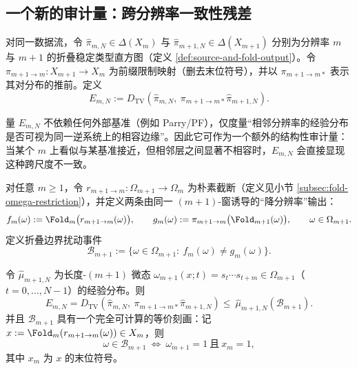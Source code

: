 \subsection{一个新的审计量：跨分辨率一致性残差}\label{subsec:multiscale-residual}

\begin{definition}[跨分辨率一致性残差]\label{def:multiscale-residual}
对同一数据流，令 \(\hat{\pi}_{m,N}\in\Delta(X_m)\) 与 \(\hat{\pi}_{m+1,N}\in\Delta(X_{m+1})\) 分别为分辨率 \(m\) 与 \(m+1\) 的折叠稳定类型直方图（定义 \ref{def:source-and-fold-output}）。令 \(\pi_{m+1\to m}:X_{m+1}\to X_m\) 为前缀限制映射（删去末位符号），并以 \(\pi_{m+1\to m*}\) 表示其对分布的推前。定义
\[
E_{m,N}
:=
D_{\mathrm{TV}}\!\left(\hat{\pi}_{m,N},\ \pi_{m+1\to m*}\hat{\pi}_{m+1,N}\right).
\]
\end{definition}

\begin{remark}[语义与可判读性]
量 \(E_{m,N}\) 不依赖任何外部基准（例如 Parry/PF），仅度量“相邻分辨率的经验分布是否可视为同一逆系统上的相容边缘”。因此它可作为一个额外的结构性审计量：当某个 \(m\) 上看似与某基准接近，但相邻层之间显著不相容时，\(E_{m,N}\) 会直接显现这种跨尺度不一致。
\end{remark}

\begin{definition}[折叠边界扰动事件]\label{def:fold-boundary-event}
对任意 $m\ge 1$，令 $r_{m+1\to m}:\Omega_{m+1}\to\Omega_m$ 为朴素截断（定义见小节 \ref{subsec:fold-omega-restriction}），并定义两条由同一 $(m{+}1)$-窗诱导的“降分辨率”输出：
\[
f_m(\omega):=\Fold_m\bigl(r_{m+1\to m}(\omega)\bigr),\qquad
g_m(\omega):=\pi_{m+1\to m}\bigl(\Fold_{m+1}(\omega)\bigr),\qquad \omega\in\Omega_{m+1}.
\]
定义折叠边界扰动事件
\[
\mathcal{B}_{m+1}:=\{\omega\in\Omega_{m+1}:\ f_m(\omega)\ne g_m(\omega)\}.
\]
\end{definition}

\begin{proposition}\label{prop:multiscale-residual-by-boundary}
令 $\hat\mu_{m+1,N}$ 为长度-$(m{+}1)$ 微态 $\omega_{m+1}(x;t)=s_t\cdots s_{t+m}\in\Omega_{m+1}$（$t=0,\dots,N-1$）的经验分布。则
\[
E_{m,N}
=D_{\mathrm{TV}}\!\left(\hat\pi_{m,N},\ \pi_{m+1\to m*}\hat\pi_{m+1,N}\right)
\le\ \hat\mu_{m+1,N}(\mathcal{B}_{m+1}).
\]
并且 $\mathcal{B}_{m+1}$ 具有一个完全可计算的等价刻画：记 $x:=\Fold_m(r_{m+1\to m}(\omega))\in X_m$，则
\[
\omega\in\mathcal{B}_{m+1}\ \Longleftrightarrow\ \omega_{m+1}=1\ \text{且}\ x_m=1,
\]
其中 $x_m$ 为 $x$ 的末位符号。
\end{proposition}

